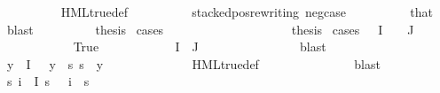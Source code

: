 \begin{isabellebody}
\ \ \ \ \ \ \ \ \isamarkupfalse%
\ HML{\isacharunderscore}{\kern0pt}true{\isacharunderscore}{\kern0pt}def\isanewline
\ \ \ \ \ \ \ \ \isamarkupfalse%
\ stacked{\isacharunderscore}{\kern0pt}pos{\isacharunderscore}{\kern0pt}rewriting\ neg{\isacharunderscore}{\kern0pt}case\isanewline
\ \ \ \ \ \ \ \ \isamarkupfalse%
\ that{\isacharparenleft}{\kern0pt}{}{\isacharparenright}{\kern0pt}\ \isamarkupfalse%
\ blast\isanewline
\ \ \ \ \ \ \isamarkupfalse%
\ \isamarkupfalse%
\ {\isacharquery}{\kern0pt}thesis\ \isamarkupfalse%
{\isacharparenleft}{\kern0pt}cases{\isacharparenright}{\kern0pt}\isanewline
\ \ \ \ \ \ \ \ \isamarkupfalse%
\ {}\isanewline
\ \ \ \ \ \ \ \ \isamarkupfalse%
\ {\isacharquery}{\kern0pt}thesis\ \isamarkupfalse%
{\isacharparenleft}{\kern0pt}cases\ {\isachardoublequoteopen}{\isasymPhi}\ {\isacharbackquote}{\kern0pt}\ I\ {\isasyminter}\ {\isasymPhi}\ {\isacharbackquote}{\kern0pt}\ J\ {\isacharequal}{\kern0pt}\ {\isacharbraceleft}{\kern0pt}{\isacharbraceright}{\kern0pt}{\isachardoublequoteclose}{\isacharparenright}{\kern0pt}\isanewline
\ \ \ \ \ \ \ \ \ \ \isamarkupfalse%
\ True\isanewline
\ \ \ \ \ \ \ \ \ \ \isamarkupfalse%
\ {\isachardoublequoteopen}I\ {\isasyminter}\ J\ {\isacharequal}{\kern0pt}\ {\isacharbraceleft}{\kern0pt}{\isacharbraceright}{\kern0pt}{\isachardoublequoteclose}\isanewline
\ \ \ \ \ \ \ \ \ \ \ \ \isamarkupfalse%
\ blast\isanewline
\ \ \ \ \ \ \ \ \ \ \isamarkupfalse%
\ {}\ \isamarkupfalse%
\ {\isachardoublequoteopen}{\isasymforall}y{\isasymin}{\isasymPhi}\ {\isacharbackquote}{\kern0pt}\ I{\isachardot}{\kern0pt}\ {\isasymphi}\ {\isasymnoteq}\ y\ {\isasymlongrightarrow}\ {\isacharparenleft}{\kern0pt}{\isasymforall}s{\isachardot}{\kern0pt}\ s\ {\isasymTurnstile}\ y{\isacharparenright}{\kern0pt}{\isachardoublequoteclose}\isanewline
\ \ \ \ \ \ \ \ \ \ \ \ \isamarkupfalse%
\ HML{\isacharunderscore}{\kern0pt}true{\isacharunderscore}{\kern0pt}def\ \isanewline
\ \ \ \ \ \ \ \ \ \ \ \ \isamarkupfalse%
\ blast\isanewline
\ \ \ \ \ \ \ \ \ \ \isamarkupfalse%
\ {\isachardoublequoteopen}{\isasymforall}s{\isachardot}{\kern0pt}\ {\isacharparenleft}{\kern0pt}{\isasymforall}i\ {\isasymin}\ I{\isachardot}{\kern0pt}\ s\ {\isasymTurnstile}\ {\isacharparenleft}{\kern0pt}{\isasymPhi}\ i{\isacharparenright}{\kern0pt}{\isacharparenright}{\kern0pt}\ {\isasymlongleftrightarrow}\ s\ {\isasymTurnstile}\ {\isasymphi}{\isachardoublequoteclose}\isanewline

\end{isabellebody}
